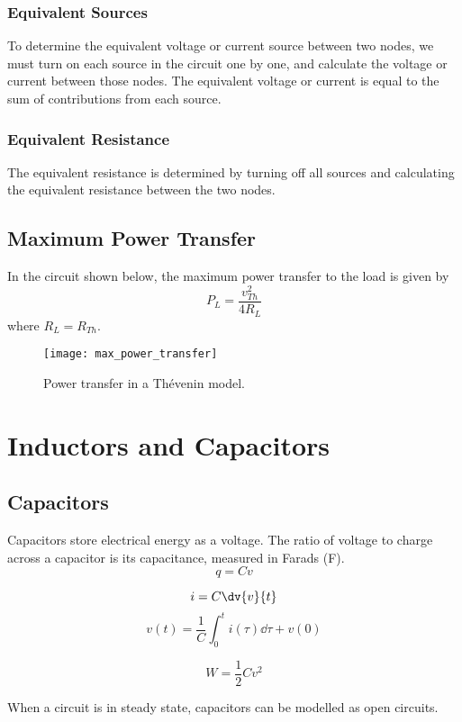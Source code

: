 \documentclass{article}
\begin{document}
\subsubsection{Equivalent Sources}
To determine the equivalent voltage or current source between two nodes, we must
turn on each source in the circuit one by one, and calculate the voltage or current
between those nodes.
The equivalent voltage or current is equal to the sum of contributions from each source.
\subsubsection{Equivalent Resistance}
The equivalent resistance is determined by turning off all sources and calculating the
equivalent resistance between the two nodes.
\subsection{Maximum Power Transfer}
In the circuit shown below, the maximum power transfer to the load is given by
\begin{equation*}
    P_L = \frac{v_{Th}^2}{4R_L}
\end{equation*}
where $R_L = R_{Th}$.
\begin{figure}[H]
    \centering
    \texttt{[image: max\_power\_transfer]}
    \caption{Power transfer in a Thévenin model.}
\end{figure}
\newpage
\section{Inductors and Capacitors}
\subsection{Capacitors}
\begin{definition}
    Capacitors store electrical energy as a voltage. The ratio of voltage
    to charge across a capacitor is its capacitance, measured in Farads (\si{\farad}).
    \begin{equation*}
        q = C v
    \end{equation*}
\end{definition}
\begin{definition}[VI Relationship]
    \begin{equation*}
        i = C \dv{v}{t}
    \end{equation*}
    \begin{equation*}
        v(t) = \frac{1}{C} \int_0^t i(\tau) \dd{\tau} + v(0)
    \end{equation*}
\end{definition}
\begin{definition}
    \begin{equation*}
        W = \frac{1}{2}Cv^2
    \end{equation*}
\end{definition}
\begin{theorem}
    When a circuit is in steady state, capacitors can be modelled as open circuits.
\end{theorem}
\end{document}
